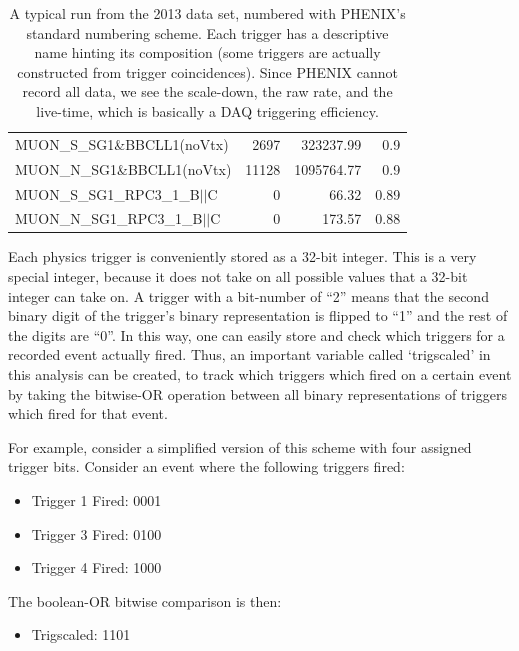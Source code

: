 \begin{table}
{\begin{tabular}{lrrr}
      MUON\_S\_SG1\&BBCLL1(noVtx) & 2697 & 323237.99 & 0.9 \\
      MUON\_N\_SG1\&BBCLL1(noVtx) & 11128 & 1095764.77 & 0.9 \\
      MUON\_S\_SG1\_RPC3\_1\_B$\vert\vert$C & 0 & 66.32 & 0.89 \\
      MUON\_N\_SG1\_RPC3\_1\_B$\vert\vert$C & 0 & 173.57 & 0.88 \\
      \bottomrule
    \end{tabular}
  }
  \caption{
    A typical run from the 2013 data set, numbered with PHENIX's standard
    numbering scheme. Each trigger has a descriptive name hinting its
    composition (some triggers are actually constructed from trigger 
    coincidences). Since PHENIX cannot record all data, we see the scale-down,
    the raw rate, and the live-time, which is basically a DAQ triggering
    efficiency.
  }
  \label{tab:typical_run}
\end{table}

Each physics trigger is conveniently stored as a 32-bit integer. This is a very
special integer, because it does not take on all possible values that a 32-bit
integer can take on. A trigger with a bit-number of ``2'' means that the second
binary digit of the trigger's binary representation is flipped to ``1'' and the
rest of the digits are ``0''. In this way, one can easily store and check which
triggers for a recorded event actually fired. Thus, an important variable called
`trigscaled' in this analysis can be created, to track which triggers which
fired on a certain event by taking the bitwise-OR operation between all binary
representations of triggers which fired for that event.

For example, consider a simplified version of this scheme with four assigned
trigger bits. Consider an event where the following triggers fired:

\begin{itemize}
    \item Trigger 1 Fired: 0001
    \item Trigger 3 Fired: 0100
    \item Trigger 4 Fired: 1000
\end{itemize}

The boolean-OR bitwise comparison is then:

\begin{itemize}
  \item Trigscaled: 1101
\end{itemize}

